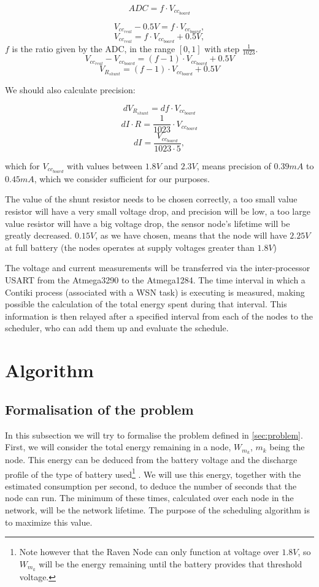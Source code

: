 \[ADC = f \cdot V_{cc_{board}}\]

\[V_{cc_{real}} - 0.5V = f \cdot V_{cc_{board}},\]
\[V_{cc_{real}} = f \cdot V_{cc_{board}} + 0.5V,\]
$f$ is the ratio given by the ADC, in the range $[0,1]$ with step $\frac{1}{1023}$.
\[V_{cc_{real}} - V_{cc_{board}} =  (f-1) \cdot V_{cc_{board}} + 0.5V\]
\[V_{R_{shunt}} = (f-1) \cdot V_{cc_{board}} + 0.5V\]

We should also calculate precision:

\[ dV_{R_{shunt}} = df \cdot V_{cc_{board}} \]
\[ dI \cdot R = \frac{1}{1023} \cdot V_{cc_{board}} \]
\[ dI = \frac{V_{cc_{board}}}{1023 \cdot 5} ,\]

which for $V_{cc_{board}}$ with values between $1.8V$ and $2.3V$, means precision of $0.39mA$ to $0.45mA$, which we consider
sufficient for our purposes.

The value of the shunt resistor needs to be chosen correctly, a too small value resistor will have a very small voltage drop, 
and precision will be low, a too large value resistor will have a big voltage drop, the sensor node's lifetime will be greatly 
decreased. $0.15V$, as we have chosen, means that the node will have $2.25V$ at full battery (the nodes operates at supply voltages 
greater than $1.8V$)

The voltage and current measurements will be transferred via the inter-processor USART from the Atmega3290 to the Atmega1284. The time interval
in which a Contiki process (associated with a WSN task) is executing is measured, making possible the calculation of the total energy spent
during that interval. This information is then relayed after a specified interval from each of the nodes to the scheduler, who can add them up
and evaluate the schedule.

\section{Algorithm}
\subsection{Formalisation of the problem}

In this subsection we will try to formalise the problem defined in \ref{sec:problem}. First, we will consider the total energy remaining in a
node, $W_{m_k}$, ${m_k}$ being the node. This energy can be deduced from the battery voltage and the discharge profile of the type of battery
used\footnote{ Note however that the Raven Node can only function at voltage over $1.8V$, so $W_{m_k}$ will be the energy remaining until 
the battery provides that threshold voltage.} . We will use this energy, together with the estimated consumption per second, to deduce the 
number of seconds that the node can run. The minimum of these times, calculated over each node in the network, will be the network lifetime.
The purpose of the scheduling algorithm is to maximize this value. 

